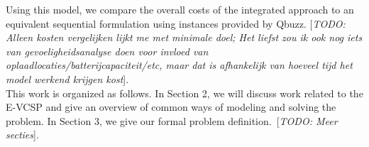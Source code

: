 \documentclass[]{article}
\newcommand{\todo}[1]{{\color{red}[\textit{TODO: #1}]}}
\begin{document}
Using this model, we compare the overall costs of the integrated approach to an equivalent sequential formulation using instances provided by Qbuzz. \todo{Alleen kosten vergelijken lijkt me met minimale doel; Het liefst zou ik ook nog iets van gevoeligheidsanalyse doen voor invloed van oplaadlocaties/batterijcapaciteit/etc, maar dat is afhankelijk van hoeveel tijd het model werkend krijgen kost}. \\  
This work is organized as follows. In Section 2, we will discuss work related to the E-VCSP and give an overview of common ways of modeling and solving the problem. In Section 3, we give our formal problem definition.\ \todo{Meer secties}.

\end{document}
